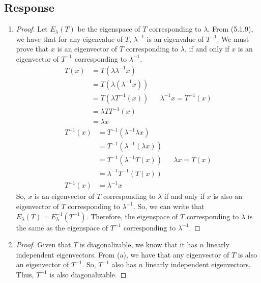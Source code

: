 \documentclass[13pt]{article}
\begin{document}
\subsection*{Response}
\begin{enumerate}[label=(\alph*),leftmargin=*]
\item
  \begin{proof}
    Let $E_\lambda(T)$ be the eigenspace of $T$ corresponding to $\lambda$. From (5.1.9), we have that for any eigenvalue of $T$, $\lambda^{-1}$ is an eigenvalue of $T^{-1}$. We must prove that $x$ is an eigenvector of $T$ corresponding to $\lambda$, if and only if $x$ is an eigenvector of $T^{-1}$ corresponding to $\lambda^{-1}$.
    \begin{align*}
      T(x) &= T(\lambda \lambda^{-1}x) \\
           &= T(\lambda (\lambda^{-1}x)) \\
           &= T(\lambda T^{-1}(x)) && \lambda^{-1} x = T^{-1}(x) \\
           &= \lambda TT^{-1}(x) \\
           &= \lambda x
    \end{align*}
    \begin{align*}
      T^{-1}(x) &= T^{-1}(\lambda^{-1}\lambda x) \\
                &= T^{-1}(\lambda^{-1}(\lambda x)) \\
                &= T^{-1}(\lambda^{-1}T(x)) && \lambda x = T(x) \\
                &= \lambda^{-1}T^{-1}(T(x)) \\
      T^{-1}(x) &= \lambda^{-1} x
    \end{align*}
    So, $x$ is an eigenvector of $T$ corresponding to $\lambda$ if and only if $x$ is also an eigenvector of $T$ corresponding to $\lambda^{-1}$. So, we can write that $E_\lambda(T) = E_\lambda^{-1}(T^{-1})$. Therefore, the eigenspace of $T$ corresponding to $\lambda$ is the same as the eigenspace of $T^{-1}$ corresponding to $\lambda^{-1}$.
  \end{proof}
\item
  \begin{proof}
    Given that $T$ is diagonalizable, we know that it has $n$ linearly independent eigenvectors. From (a), we have that any eigenvector of $T$ is also an eigenvector of $T^{-1}$. So, $T^{-1}$ also has $n$ linearly independent eigenvectors. Thus, $T^{-1}$ is also diagonalizable.
  \end{proof}
\end{enumerate}
\end{document}
